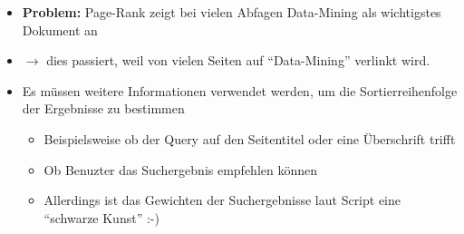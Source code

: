 \begin{frame}[c]

  \begin{itemize}
  \item \textbf{Problem:} Page-Rank zeigt bei vielen Abfagen Data-Mining als
  wichtigstes Dokument an
  \item $\rightarrow$ dies passiert, weil von vielen Seiten auf ``Data-Mining''
  verlinkt wird.
  \item Es müssen weitere Informationen verwendet werden, um die
  Sortierreihenfolge der Ergebnisse zu bestimmen
  \begin{itemize}
  \item Beispielsweise ob der Query auf den Seitentitel oder eine Überschrift
  trifft
  \item Ob Benuzter das Suchergebnis empfehlen können
  \item Allerdings ist das Gewichten der Suchergebnisse laut Script eine
  ``schwarze Kunst'' :-)
\end{itemize}
\end{itemize}
\end{frame}